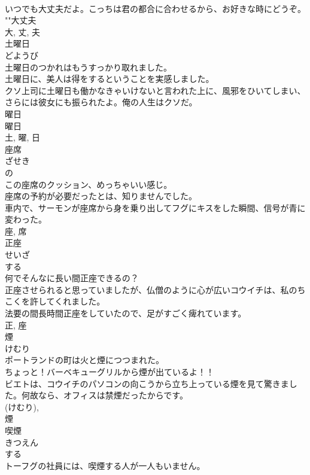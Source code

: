 \documentclass[8pt]{extreport}
\begin{document}
\begin{CJK}{UTF8}{min}
\\	いつでも大丈夫だよ。こっちは君の都合に合わせるから、お好きな時にどうぞ。	
\\	""大丈夫
\\	大, 丈, 夫	
\\	土曜日	
\\	どようび	
\\	土曜日のつかれはもうすっかり取れました。	
\\	土曜日に、美人は得をするということを実感しました。	
\\	クソ上司に土曜日も働かなきゃいけないと言われた上に、風邪をひいてしまい、さらには彼女にも振られたよ。俺の人生はクソだ。	
\\	曜日 
\\	曜日 
\\	土, 曜, 日	
\\	座席	
\\	ざせき	
\\	の 
\\	この座席のクッション、めっちゃいい感じ。	
\\	座席の予約が必要だったとは、知りませんでした。	
\\	車内で、サーモンが座席から身を乗り出してフグにキスをした瞬間、信号が青に変わった。	
\\	座, 席	
\\	正座	
\\	せいざ	
\\	する 
\\	何でそんなに長い間正座できるの？	
\\	正座させられると思っていましたが、仏僧のように心が広いコウイチは、私のちこくを許してくれました。	
\\	法要の間長時間正座をしていたので、足がすごく痺れています。	
\\	正, 座	
\\	煙	
\\	けむり	
\\	ポートランドの町は火と煙につつまれた。	
\\	ちょっと！バーベキューグリルから煙が出ているよ！！	
\\	ビエトは、コウイチのパソコンの向こうから立ち上っている煙を見て驚きました。何故なら、オフィスは禁煙だったからです。	
\\	(けむり), 
\\	煙	
\\	喫煙	
\\	きつえん	
\\	する 
\\	トーフグの社員には、喫煙する人が一人もいません。	

\end{CJK}
\end{document}
